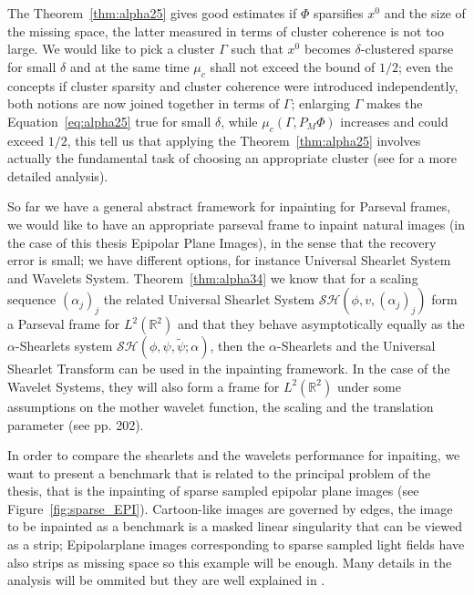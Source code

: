 \bigskip

The Theorem~\ref{thm:alpha25} gives good estimates if $\Phi$ sparsifies $x^0$ and the size of the missing space, the latter measured in terms of cluster coherence is not too large. We would like to pick a cluster $\Gamma$ such that $x^0$ becomes $\delta$-clustered sparse for small $\delta$ and at the same time $\mu_c$ shall not exceed the bound of $1/2$; even the concepts if cluster sparsity and cluster coherence were introduced independently, both notions are now joined together in terms of $\Gamma$; enlarging $\Gamma$ makes the Equation~\ref{eq:alpha25} true for small $\delta$, while $\mu_c(\Gamma,P_M\Phi)$ increases and could exceed $1/2$, this tell us that applying the Theorem~\ref{thm:alpha25} involves actually the fundamental task of choosing an appropriate cluster (see \cite{Firstinpaint} for a more detailed analysis). 

\bigskip

So far we have a general abstract framework for inpainting for Parseval frames, we would like to have an appropriate parseval frame to inpaint natural images (in the case of this thesis Epipolar Plane Images), in the sense that the recovery error is small; we have different options, for instance Universal Shearlet System and Wavelets System. Theorem~\ref{thm:alpha34} we know that for a scaling sequence $(\alpha_j)_j$ the related Universal Shearlet System $\mathcal{SH}(\phi,v,(\alpha_j)_j)$ form a Parseval frame for $L^2(\mathbb{R}^2)$ and that they behave asymptotically equally as the $\alpha$-Shearlets system $\mathcal{SH}(\phi,\psi,\tilde{\psi};\alpha)$, then the $\alpha$-Shearlets and the Universal Shearlet Transform can be used in the inpainting framework. In the case of the Wavelet Systems, they will also form a frame for $L^2(\mathbb{R}^2)$ under some assumptions on the mother wavelet function, the scaling and the translation parameter (see \cite{Mallat} pp. 202).

\bigskip

In order to compare the shearlets and the wavelets performance for inpaiting, we want to present a benchmark that is related to the principal problem of the thesis, that is the inpainting of sparse sampled epipolar plane images (see Figure~\ref{fig:sparse_EPI}). Cartoon-like images are governed by edges, the image to be inpainted as a benchmark is a masked linear singularity that can be viewed as a strip; Epipolarplane images corresponding to sparse sampled light fields have also strips as missing space so this example will be enough. Many details in the analysis will be ommited but they are well explained in \cite{Gitta-alpha}. 

